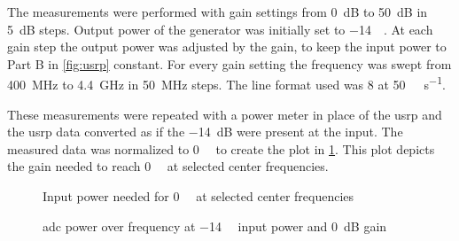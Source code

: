 \documentclass[12pt,a4paper,parskip=full,abstracton]{scrartcl}
\begin{document}
The measurements were performed with gain settings from \SI{0}{\deci\bel} to
\SI{50}{\deci\bel} in \SI{5}{\deci\bel} steps. Output power of the generator
was initially set to \SI{-14}{\deci\belm}. At each gain step the output
power was adjusted by the gain, to keep the input power to Part B in \cref{fig:usrp} constant.
For every gain setting the frequency was swept from \SI{400}{\mega\hertz} to \SI{4.4}{\giga\hertz} in
\SI{50}{\mega\hertz} steps. The line format used was \SI{8}{\bit} at
\SI{50}{\mega\samples\per\second}.

These measurements were repeated with a power meter in place of the
\gls{usrp} and the \gls{usrp} data converted as if the \SI{-14}{\deci\bel}
were present at the input. The measured data was normalized to
\SI{0}{\deci\belfs} to create the plot in \cref{fig:inputfscrf}.
This plot depicts the gain needed to reach \SI{0}{\deci\belfs} at selected center frequencies.

\begin{figure}[htb]
    \centering
{}
    \caption{Input power needed for \SI{0}{\deci\belfs} at selected center frequencies}
    \label{fig:inputfscrf}
\end{figure}

\begin{figure}[htb]
    \centering
{}
    \caption{\gls{adc} power over frequency at \SI{-14}{\deci\belm} input power and \SI{0}{\deci\bel} gain}
    \label{fig:gainfscrf}
\end{figure}
\end{document}
